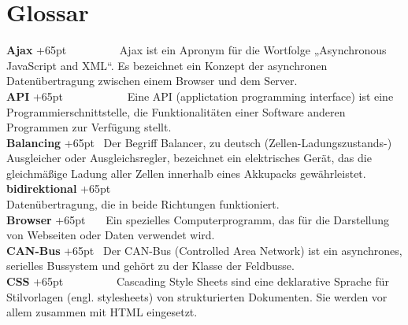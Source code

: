 \documentclass[fontsize = 12pt, paper = a4]{scrreprt}
\begin{document}








\chapter*{Glossar}



\textbf{Ajax}
\hangindent+65pt 
\ \ \ \ \ \ \ \ \ Ajax ist ein Apronym für die Wortfolge „Asynchronous JavaScript and XML“. Es bezeichnet ein Konzept der asynchronen Datenübertragung zwischen einem Browser und dem Server.\\

\textbf{API}
\hangindent+65pt 
\ \ \ \ \ \ \ \ \ \ \ Eine API (applictation programming interface) ist eine Programmierschnitt\-stelle, die Funktionalitäten einer Software anderen Programmen zur Verfügung stellt.\\

\textbf{Balancing}
\hangindent+65pt 
\ Der Begriff Balancer, zu deutsch (Zellen-Ladungszustands-) Ausgleicher oder Ausgleichsregler, bezeichnet ein elektrisches Gerät, das die gleichmäßige Ladung aller Zellen innerhalb eines Akkupacks gewährleistet.\\

\textbf{bidirektional}
\hangindent+65pt  \\
Datenübertragung, die in beide Richtungen funktioniert. \\

\textbf{Browser}
\hangindent+65pt 
\ \ \ Ein spezielles Computerprogramm, das für die Darstellung von Webseiten oder Daten verwendet wird.\\

\textbf{CAN-Bus}
\hangindent+65pt 
\ Der CAN-Bus (Controlled Area Network) ist ein asynchrones, serielles Bussystem und gehört zu der Klasse der Feldbusse.\\

\textbf{CSS}
\hangindent+65pt 
\ \ \ \ \ \ \ \ \   Cascading Style Sheets sind eine deklarative Sprache für Stilvorlagen (engl. stylesheets) von strukturierten Dokumenten. Sie werden vor allem zusammen mit HTML eingesetzt.\\
\end{document}
